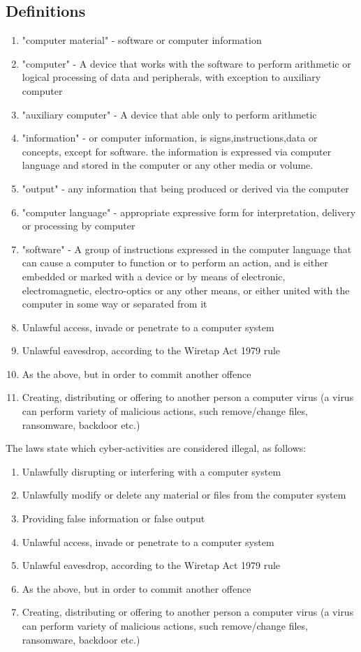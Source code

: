 \subsection{Definitions}
\begin{enumerate}
    \item "computer material" - software or computer information
    \item "computer" - A device that works with the software to perform arithmetic or logical processing of data and peripherals, with exception to auxiliary computer
    \item "auxiliary computer" - A device that able only to perform arithmetic
    \item "information" - or computer information, is signs,instructions,data or concepts, except for software. the information is expressed via computer language and stored in the computer or any other media or volume.
    \item "output" - any information that being produced or derived via the computer
    \item "computer language" - appropriate expressive form for interpretation, delivery or processing by computer
     \item "software" - A group of instructions expressed in the computer language that can cause a computer to function or to perform an action, and is either embedded or marked with a device or by means of electronic, electromagnetic, electro-optics or any other means, or either united with the computer in some way or separated from it
    \item Unlawful access, invade or penetrate to a computer system
    \item Unlawful eavesdrop, according to the Wiretap Act 1979 rule
    \item As the above, but in order to commit another offence
    \item Creating, distributing or offering to another person a computer virus (a virus can perform  variety of malicious actions, such remove/change files, ransomware, backdoor etc.)
\end{enumerate}

The laws state which cyber-activities are considered illegal, as follows:
\begin{enumerate}
    \item Unlawfully disrupting or interfering with a computer system
    \item Unlawfully modify or delete any material or files from the computer system
    \item Providing false information or false output
    \item Unlawful access, invade or penetrate to a computer system
    \item Unlawful eavesdrop, according to the Wiretap Act 1979 rule
    \item As the above, but in order to commit another offence
    \item Creating, distributing or offering to another person a computer virus (a virus can perform  variety of malicious actions, such remove/change files, ransomware, backdoor etc.)
\end{enumerate}

